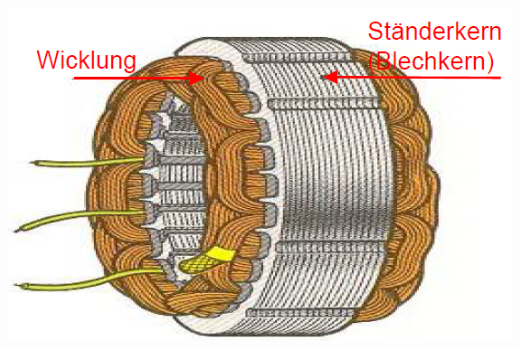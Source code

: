     \begin{minipage}[b]{0.33\linewidth}
    	\includegraphics[scale = 0.4]{images/AsynchronmotorStaenderkern}
    \end{minipage}\\
